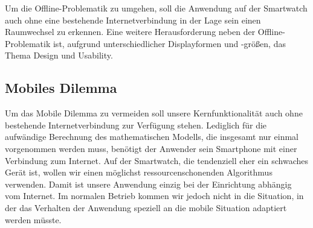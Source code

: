 Um die Offline-Problematik zu umgehen, soll die Anwendung auf der Smartwatch auch ohne eine bestehende Internetverbindung in der Lage sein einen Raumwechsel zu erkennen. Eine weitere Herausforderung neben der Offline-Problematik ist, aufgrund unterschiedlicher Displayformen und -größen, das Thema Design und Usability.

\subsection{Mobiles Dilemma}
Um das Mobile Dilemma zu vermeiden soll unsere Kernfunktionalität auch ohne bestehende Internetverbindung zur Verfügung stehen. Lediglich für die aufwändige Berechnung des mathematischen Modells, die insgesamt nur einmal vorgenommen werden muss, benötigt der Anwender sein Smartphone mit einer Verbindung zum Internet. Auf der Smartwatch, die tendenziell eher ein schwaches Gerät ist, wollen wir einen möglichst ressourcenschonenden Algorithmus verwenden. Damit ist unsere Anwendung einzig bei der Einrichtung abhängig vom Internet. Im normalen Betrieb kommen wir jedoch nicht in die Situation, in der das Verhalten der Anwendung speziell an die mobile Situation adaptiert werden müsste.


